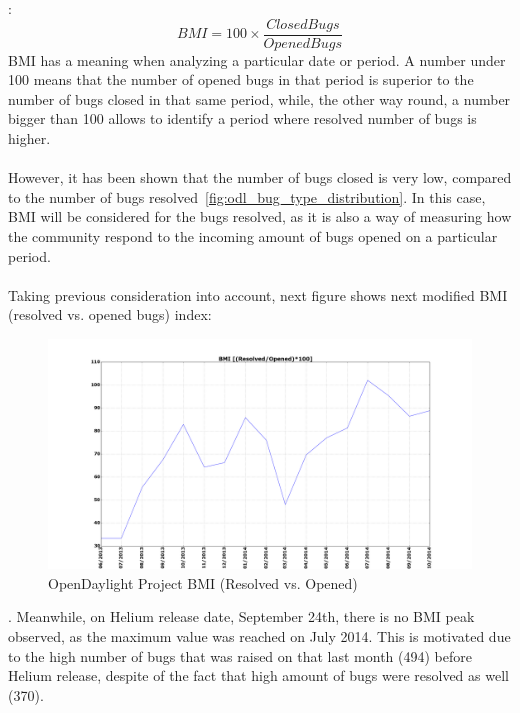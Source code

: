 \documentclass[a4paper, 12pt]{book}
\begin{document}
{: \[BMI = 100\times\dfrac{Closed Bugs}{Opened Bugs}\]
BMI has a meaning when analyzing a particular date or period. A number under 100 means that the number of opened bugs in that period is superior to the number of bugs closed in that same period, while, the other way round, a number bigger than 100 allows to identify a period where resolved number of bugs is higher.\\
\\
However, it has been shown that the number of bugs closed is very low, compared to the number of bugs resolved~\ref{fig:odl_bug_type_distribution}. In this case, BMI will be considered for the bugs resolved, as it is also a way of measuring how the community respond to the incoming amount of bugs opened on a particular period.\\
\\
Taking previous consideration into account, next figure shows next modified BMI (resolved vs. opened bugs) index:
\begin{center}
 \begin{figure}[H]
 \begin{center}
   \includegraphics[width=17cm]{img/bmi_resolved_vs_opened_01.png}
   \caption{OpenDaylight Project BMI (Resolved vs. Opened)}
   \label{fig:odl_bugs_resolved_month}
 \end{center}
 \end{figure}
\end{center}
. Meanwhile, on Helium release date, September 24th, there is no BMI peak observed, as the maximum value was reached on July 2014. This is motivated due to the high number of bugs that was raised on that last month (494) before Helium release, despite of the fact that high amount of bugs were resolved as well (370).\\
}
\end{document}

